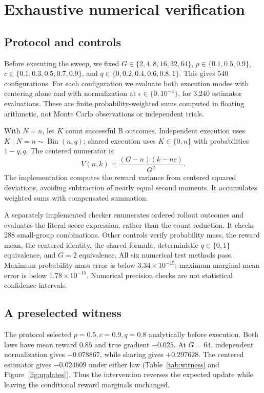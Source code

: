 \documentclass[10pt,letterpaper]{article}
\newcommand{\Bin}{\operatorname{Bin}}
\begin{document}
\section{Exhaustive numerical verification}
\subsection{Protocol and controls}
Before executing the sweep, we fixed $G\in\{2,4,8,16,32,64\}$,
$p\in\{0.1,0.5,0.9\}$, $c\in\{0.1,0.3,0.5,0.7,0.9\}$, and
$q\in\{0,0.2,0.4,0.6,0.8,1\}$. This gives 540 configurations.
For each configuration we evaluate both execution modes with centering alone
and with normalization at $\epsilon\in\{0,10^{-4}\}$, for 3,240 estimator
evaluations. These are finite probability-weighted sums computed in floating
arithmetic, not Monte Carlo observations or independent trials.

With $N=n$, let $K$ count successful B outcomes. Independent execution uses
$K\mid N=n\sim\Bin(n,q)$; shared execution uses $K\in\{0,n\}$ with
probabilities $1-q,q$. The centered numerator is
\begin{equation}
V(n,k)=\frac{(G-n)(k-nc)}{G^2}.
\end{equation}
The implementation computes the reward variance from centered squared
deviations, avoiding subtraction of nearly equal second moments. It accumulates
weighted sums with compensated summation.

A separately implemented checker enumerates ordered rollout outcomes and
evaluates the literal score expression, rather than the count reduction. It
checks 288 small-group combinations. Other controls verify probability mass,
the reward mean, the centered identity, the shared formula, deterministic
$q\in\{0,1\}$ equivalence, and $G=2$ equivalence. All six numerical test methods pass.
Maximum probability-mass error is below $3.34\times10^{-15}$; maximum marginal-mean
error is below $1.78\times10^{-15}$. Numerical precision checks are not statistical
confidence intervals.

\subsection{A preselected witness}
The protocol selected $p=0.5,c=0.9,q=0.8$ analytically before execution.
Both laws have mean reward $0.85$ and true gradient $-0.025$. At $G=64$,
independent normalization gives $-0.078867$, while sharing gives $+0.297628$.
The centered estimator gives $-0.024609$ under either law
(Table~\ref{tab:witness} and Figure~\ref{fig:updates}). Thus the intervention reverses the expected update
while leaving the conditional reward marginals unchanged.
\end{document}
